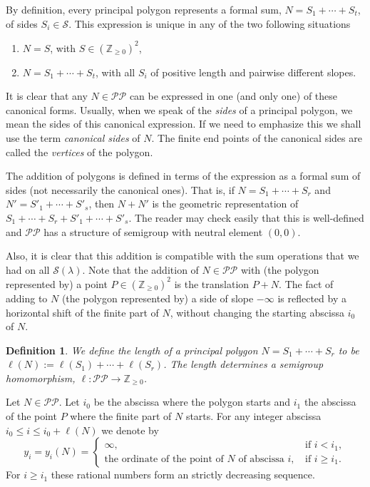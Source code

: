 \documentclass{amsart}
\newtheorem{definition}[theorem]{Definition}
\newcommand{\Z}{\mathbb Z}
\def\la{\lambda}
\def\lra{\longrightarrow}
\def\pol{{\mathcal P}{\mathcal P}}
\def\ss{{\mathcal S}}
\begin{document}
By definition, every principal polygon represents a formal sum, $N=S_1+\cdots+S_t$, of sides $S_i\in\ss$. This expression is unique in any of the two following situations
\begin{enumerate}
 \item $N=S$, with $S\in(\Z_{\ge0})^2$,
\item $N=S_1+\cdots+S_t$, with all $S_i$ of positive length and pairwise different slopes.
\end{enumerate}
It is clear that any $N\in\pol$ can be expressed in one (and only one) of these canonical forms. 
Usually, when we speak of the \emph{sides} of a principal polygon, we mean the sides of this canonical expression. If we need to emphasize this we shall use the term \emph{canonical sides} of $N$. The finite end points of the canonical sides are called the \emph{vertices} of the polygon.

The addition of polygons is defined in terms of the expression as a formal sum of sides (not necessarily the canonical ones). That is, if 
$N=S_1+\cdots+S_r$ and $N'=S'_1+\cdots+ S'_s$, then $N+N'$ is the geometric representation of $S_1+\cdots+S_r+S'_1+\cdots +S'_s$. The reader may check easily that this is well-defined and $\pol$ has a structure of semigroup with neutral element $(0,0)$.

Also, it is clear that this addition is compatible with the sum operations that we had on all $\ss(\la)$. Note that the addition of $N\in\pol$ with (the polygon represented by) a point $P\in(\Z_{\ge0})^2$ is the translation $P+N$. The fact of adding to $N$ (the polygon represented by) a side of slope $-\infty$ is reflected by a horizontal shift of the finite part of $N$, without changing the starting abscissa $i_0$ of $N$.

\begin{definition}
We define the length of a principal polygon $N=S_1+\cdots+S_r$ to be $\ell(N):=\ell(S_1)+\cdots+\ell(S_r)$.
The length determines a semigroup homomorphism, $\ell\colon \pol\lra \Z_{\ge 0}$.
\end{definition}

Let $N\in\pol$. Let $i_0$ be the abscissa where the polygon starts and $i_1$ the abscissa of the point $P$ where the finite part of $N$ starts. For any integer abscissa $i_0 \le i\le i_0+\ell(N)$ we denote by
$$y_i=y_i(N)=\left\{\begin{array}{ll}
 \infty,&\mbox{ if }i<i_1,\\
\mbox{the ordinate of the point of $N$ of abscissa $i$,}&\mbox{ if }i\ge i_1.
\end{array}\right.
$$  For $i\ge i_1$ these rational numbers form an strictly decreasing sequence.
\end{document}
